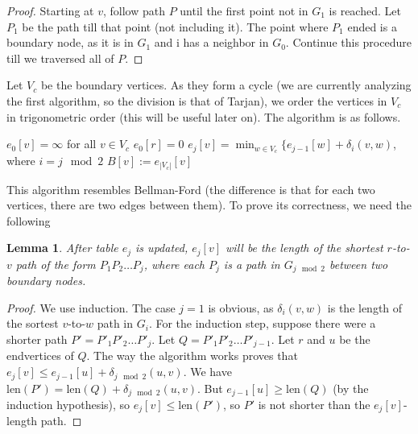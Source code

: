 \documentclass[11pt]{article}
\newtheorem{lemma}[theorem]{Lemma}
\begin{document}
\begin{proof}
Starting at $v$, follow path $P$ until the first point not in $G_1$ is reached. Let $P_1$ be the path till that point (not including it). The point where $P_1$ ended is a boundary node, as it is in $G_1$ and i has a neighbor in $G_0$. Continue this procedure till we traversed all of $P$.
\end{proof}

Let $V_c$ be the boundary vertices. As they form a cycle (we are currently analyzing the first algorithm, so the division is that of Tarjan), we order the vertices in $V_c$ in trigonometric order (this will be useful later on). The algorithm is as follows.

\begin{algorithm}[!htb]
  \label{alg: bellman-ford}
  \begin{algorithmic}
    \State $e_0[v] = \infty$ for all $v \in V_c$
    \State $e_0[r] = 0$
        \State $e_j[v] = \min_{w\in V_c} \{e_{j-1}[w] + \delta_i(v,w)$, where $i = j \mod 2$
      \EndFor
    \EndFor
      \State $B[v] := e_{|V_c|}[v]$
    \EndFor
  \end{algorithmic}
\end{algorithm}

This algorithm resembles Bellman-Ford (the difference is that for each two vertices, there are two edges between them). To prove its correctness, we need the following

\begin{lemma}
After table $e_j$ is updated, $e_j[v]$ will be the length of the shortest $r$-to-$v$ path of the form $P_1P_2\ldots P_j$, where each $P_j$ is a path in $G_{j\mod 2}$ between two boundary nodes.
\end{lemma}

\begin{proof}
We use induction. The case $j=1$ is obvious, as $\delta_i(v,w)$ is the length of the sortest $v$-to-$w$ path in $G_i$. For the induction step, suppose there were a shorter path $P' = P'_1P'_2\ldots P'_j$. Let $Q = P'_1P'_2\ldots P'_{j-1}$. Let $r$ and $u$ be the endvertices of $Q$. The way the algorithm works proves that $e_j[v] \leq e_{j-1}[u] + \delta_{j\mod 2}(u,v)$. We have $\text{len}(P') = \text{len}(Q) + \delta_{j\mod 2}(u,v)$. But $e_{j-1}[u]\geq \text{len}(Q)$ (by the induction hypothesis), so $e_j[v]\leq \text{len}(P')$, so $P'$ is not shorter than the $e_j[v]$-length path.
\end{proof}
\end{document}

